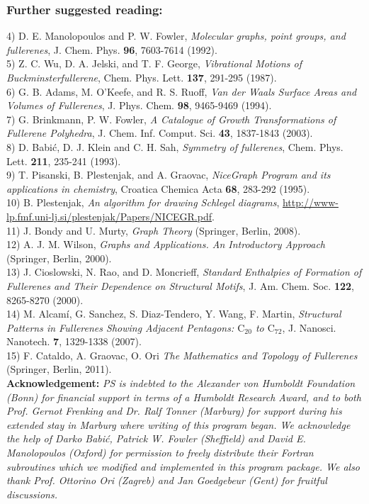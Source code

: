 \documentclass[article,a4paper,twoside]{memoir}
\newcommand{\C}[1]{\ensuremath{\mathrm{C}_{#1}}}
\begin{document}
\subsubsection*{Further suggested reading:}
4) D. E. Manolopoulos and P. W. Fowler, \textit{Molecular graphs, point groups, 
and fullerenes}, J. Chem. Phys. \textbf{96}, 7603-7614 (1992).\\
5) Z. C. Wu, D. A. Jelski, and T. F. George, \textit{Vibrational Motions of
Buckminsterfullerene}, Chem. Phys. Lett. \textbf{137}, 291-295 (1987).\\
6) G. B. Adams, M. O'Keefe, and R. S. Ruoff, \textit{Van der Waals Surface Areas
and Volumes of Fullerenes}, J. Phys. Chem. \textbf{98}, 9465-9469 (1994).\\
7) G. Brinkmann, P. W. Fowler, \textit{A Catalogue of Growth Transformations of Fullerene Polyhedra}, 
J. Chem. Inf. Comput. Sci. \textbf{43}, 1837-1843 (2003).\\
8) D. Babi\'c, D. J. Klein and C. H. Sah, \textit{Symmetry of fullerenes},
Chem. Phys. Lett. \textbf{211}, 235-241 (1993).\\
9) T. Pisanski, B. Plestenjak, and A. Graovac, \textit{NiceGraph Program and its 
applications in chemistry}, Croatica Chemica Acta \textbf{68}, 283-292 (1995).\\
10) B. Plestenjak, \textit{An algorithm for drawing Schlegel diagrams}, \url{http://www-lp.fmf.uni-lj.si/plestenjak/Papers/NICEGR.pdf}.\\
11) J. Bondy and U. Murty, \textit{Graph Theory} (Springer, Berlin, 2008).\\
12) A. J. M. Wilson, \textit{Graphs and Applications. An Introductory Approach} (Springer, Berlin, 2000).\\
13) J. Cioslowski, N. Rao, and D. Moncrieff, \textit{Standard Enthalpies of Formation of Fullerenes and Their
Dependence on Structural Motifs}, J. Am. Chem. Soc. \textbf{122}, 8265-8270 (2000).\\
14) M. Alcam\'i, G. Sanchez, S. Diaz-Tendero, Y. Wang, F. Martin, \textit{Structural Patterns in Fullerenes Showing
Adjacent Pentagons: \C{20} to \C{72}}, J. Nanosci. Nanotech. \textbf{7}, 1329-1338 (2007).\\
15) F. Cataldo, A. Graovac, O. Ori \textit{The Mathematics and Topology of Fullerenes} (Springer, Berlin, 2011).\\

\textbf{Acknowledgement:} \textit{PS is indebted to the Alexander von Humboldt Foundation (Bonn) for financial support 
in terms of a Humboldt Research Award, and to both Prof. Gernot Frenking and 
Dr. Ralf Tonner (Marburg) for support during his extended stay in Marburg where 
writing of this program began. We acknowledge the help of Darko Babi\'c, Patrick 
W. Fowler (Sheffield) and David E. Manolopoulos (Oxford) for permission to freely distribute 
their Fortran subroutines which we modified and implemented in this program package.
We also thank Prof. Ottorino Ori (Zagreb) and Jan Goedgebeur (Gent) for fruitful discussions.}
\end{document}
